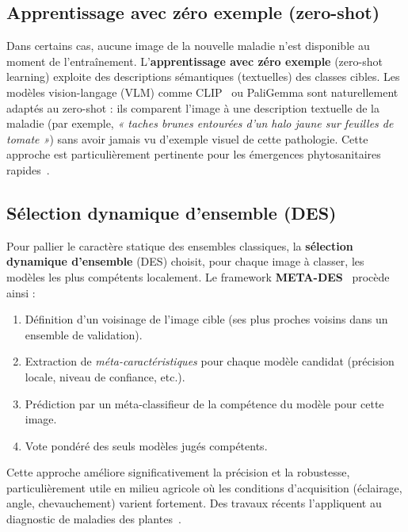 \subsection{Apprentissage avec zéro exemple (zero-shot)}
Dans certains cas, aucune image de la nouvelle maladie n’est disponible au moment de l’entraînement. L’\textbf{apprentissage avec zéro exemple} (zero-shot learning) exploite des descriptions sémantiques (textuelles) des classes cibles. Les modèles vision-langage (VLM) comme CLIP~\cite{radford2021learning} ou PaliGemma sont naturellement adaptés au zero-shot : ils comparent l’image à une description textuelle de la maladie (par exemple, \textit{« taches brunes entourées d’un halo jaune sur feuilles de tomate »}) sans avoir jamais vu d’exemple visuel de cette pathologie. Cette approche est particulièrement pertinente pour les émergences phytosanitaires rapides~\cite{li2020zero}.

\subsection{Sélection dynamique d’ensemble (DES)}
Pour pallier le caractère statique des ensembles classiques, la \textbf{sélection dynamique d’ensemble} (DES) choisit, pour chaque image à classer, les modèles les plus compétents localement. Le framework \textbf{META-DES}~\cite{cruz2018meta} procède ainsi :
\begin{enumerate}
	\item Définition d’un voisinage de l’image cible (ses plus proches voisins dans un ensemble de validation).
	\item Extraction de \textit{méta-caractéristiques} pour chaque modèle candidat (précision locale, niveau de confiance, etc.).
	\item Prédiction par un méta-classifieur de la compétence du modèle pour cette image.
	\item Vote pondéré des seuls modèles jugés compétents.
\end{enumerate}
Cette approche améliore significativement la précision et la robustesse, particulièrement utile en milieu agricole où les conditions d’acquisition (éclairage, angle, chevauchement) varient fortement. Des travaux récents l'appliquent au diagnostic de maladies des plantes~\cite{zhang2020dynamic}.

